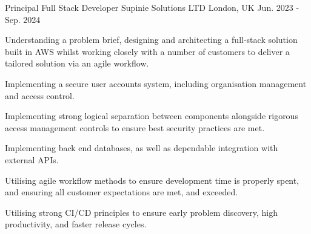 



\begin{cventries}

\cventry
{Principal Full Stack Developer} %
{Supinie Solutions LTD} %
{London, UK} %
{Jun. 2023 - Sep. 2024} %
{ %
\begin{cvitems}\vspace{-4mm}
\item {Understanding a problem brief, designing and architecting a full-stack solution built in AWS whilst working closely with a number of customers to deliver a tailored solution via an agile workflow.}
\item {Implementing a secure user accounts system, including organisation management and access control.}
\item {Implementing strong logical separation between components alongside rigorous access management controls to ensure best security practices are met.}
\item {Implementing back end databases, as well as dependable integration with external APIs.}
\item {Utilising agile workflow methods to ensure development time is properly spent, and ensuring all customer expectations are met, and exceeded.}
\item {Utilising strong CI/CD principles to ensure early problem discovery, high productivity, and faster release cycles.}
\vspace{4mm}\end{cvitems}
}



\end{cventries}
